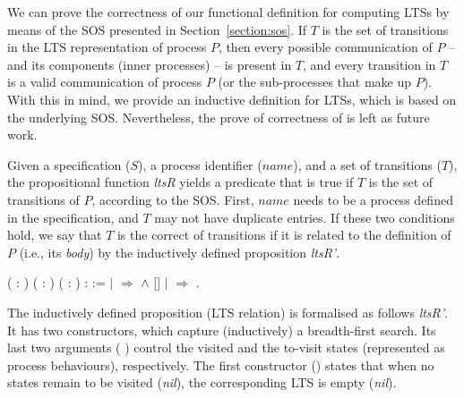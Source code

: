 We can prove the correctness of our functional definition for computing LTSs by means of the SOS presented in Section~\ref{section:sos}. If $ T $ is the set of transitions in the LTS representation of process $ P $, then every possible communication of $ P $ -- and its components (inner processes) -- is present in $ T $, and every transition in $ T $ is a valid communication of process $ P $ (or the sub-processes that make up $ P $). With this in mind, we provide an inductive definition for LTSs, which is based on the underlying SOS. Nevertheless, the prove of correctness of  is left as future work.

Given a specification ($S$), a process identifier ($name$), and a set of transitions ($T$), the propositional function \emph{ltsR} yields a predicate that is true if $T$ is the set of transitions of $P$, according to the \CSPcoq{} SOS. First, $name$ needs to be a process defined in the specification, and $T$ may not have duplicate entries. If these two conditions hold, we say that $T$ is the correct of transitions if it is related to the definition of $P$ (i.e., its \emph{body}) by the inductively defined proposition \emph{ltsR'}.

\begin{coqdoccode}
	\coqdocnoindent
	  ( : ) ( : ) ( :  ) :  :=\coqdoceol
	\coqdocindent{1.00em}
	    \coqdoceol
	\coqdocindent{1.00em}
	\ensuremath{|}   \ensuremath{\Rightarrow}   \ensuremath{\land}    [] \coqdoceol
	\coqdocindent{1.00em}
	\ensuremath{|}  \ensuremath{\Rightarrow} \coqdoceol
	\coqdocindent{1.00em}
	.\coqdoceol
\end{coqdoccode}

The inductively defined proposition (LTS relation) is formalised as follows \emph{ltsR'}. It has two constructors, which capture (inductively) a breadth-first search. Its last two arguments ( ) control the visited and the to-visit states (represented as process behaviours), respectively. The first constructor () states that when no states remain to be visited (\emph{nil}), the corresponding LTS is empty (\emph{nil}).

